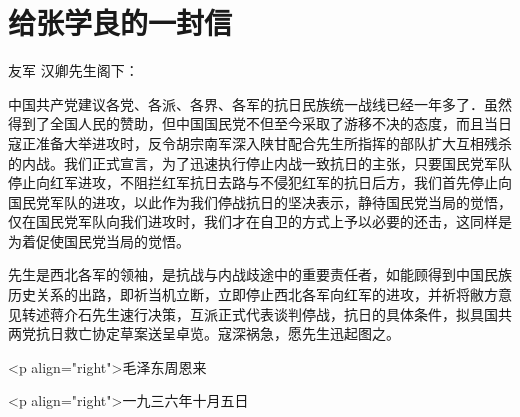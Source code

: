 \section[给张学良的一封信（一九三六年十月五）]{给张学良的一封信}


友军
汉卿先生阁下：

中国共产党建议各党、各派、各界、各军的抗日民族统一战线已经一年多了．虽然得到了全国人民的赞助，但中国国民党不但至今采取了游移不决的态度，而且当日寇正准备大举进攻时，反令胡宗南军深入陕甘配合先生所指挥的部队扩大互相残杀的内战。我们正式宣言，为了迅速执行停止内战一致抗日的主张，只要国民党军队停止向红军进攻，不阻拦红军抗日去路与不侵犯红军的抗日后方，我们首先停止向国民党军队的进攻，以此作为我们停战抗日的坚决表示，静待国民党当局的觉悟，仅在国民党军队向我们进攻时，我们才在自卫的方式上予以必要的还击，这同样是为着促使国民党当局的觉悟。

先生是西北各军的领袖，是抗战与内战歧途中的重要责任者，如能顾得到中国民族历史关系的出路，即祈当机立断，立即停止西北各军向红军的进攻，并祈将敝方意见转述蒋介石先生速行决策，互派正式代表谈判停战，抗日的具体条件，拟具国共两党抗日救亡协定草案送呈卓览。寇深祸急，愿先生迅起图之。

<p align="right">毛泽东周恩来

<p align="right">一九三六年十月五日

